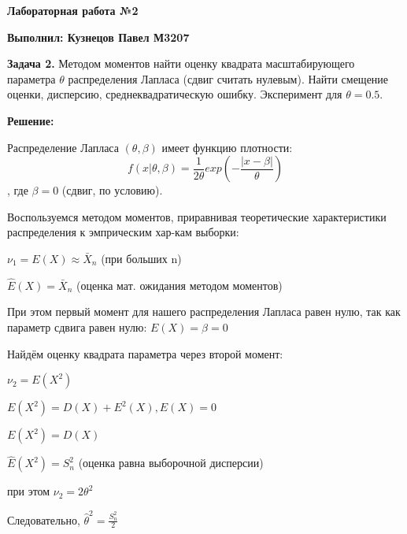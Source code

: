 \documentclass{article}
\begin{document}
\Large\textbf{Лабораторная работа №2}

\textbf{Выполнил: Кузнецов Павел М3207}
\vspace{5mm}

\textbf{Задача 2.} Методом моментов найти оценку квадрата масштабирующего параметра $\theta$ распределения Лапласа (сдвиг считать нулевым). Найти смещение оценки, дисперсию, среднеквадратическую ошибку. Эксперимент для $\theta=0.5$.
\vspace{5mm}

\textbf{Решение:}

Распределение Лапласа $(\theta, \beta)$ имеет функцию плотности: $$f(x | \theta,\beta) = \frac{1}{2\theta}exp(-\frac{|x-\beta|}{\theta})$$
, где $\beta=0$ (сдвиг, по условию).

Воспользуемся методом моментов, приравнивая теоретические характеристики распределения к эмприческим хар-кам выборки: 
\begin{center}
$\nu_1 = E(X) \approx \bar X_n$ (при больших n)

$\hat E(X)= \bar X_n$ (оценка мат. ожидания методом моментов)
\end{center}
При этом первый момент для нашего распределения Лапласа равен нулю, так как параметр сдвига равен нулю: $E(X) = \beta = 0$

Найдём оценку квадрата параметра через второй момент: 
\begin{center}
    $\nu_2 = E(X^2)$
    
    $E(X^2) = D(X) + E^2(X), E(X) = 0$

    $E(X^2) = D(X)$

    $\hat E(X^2) = S^2_n$ (оценка равна выборочной дисперсии)
    
    при этом $\nu_2 = 2\theta^2$

    Следовательно, $\hat \theta^2 = \frac{S^2_n}{2}$
\end{center}
\end{document}
